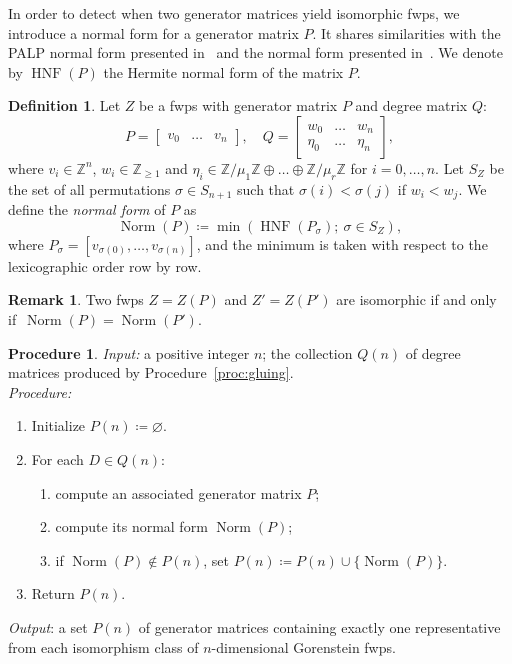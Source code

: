 \documentclass{amsart}
\DeclareMathOperator{\HNF}{HNF}
\DeclareMathOperator{\Norm}{Norm}
\newcommand{\Z}{\mathbb{Z}}
\theoremstyle{definition}
\newtheorem{definition}[lem]{Definition}
\newtheorem{remark}[lem]{Remark}
\newtheorem{procedure}[lem]{Procedure}
\begin{document}
In order to detect when two generator matrices yield isomorphic fwps, we introduce a normal form for a generator matrix $P$. It shares similarities with the PALP normal form presented in~\cite{KS} and the normal form presented in~\cite{Bauerle2}. We denote by $\HNF(P)$ the Hermite normal form of the matrix $P$.

\begin{definition}
    Let $Z$ be a fwps with generator matrix $P$ and degree matrix $Q$:
    $$
    P=\begin{bmatrix}
        v_0 & \dots & v_n
    \end{bmatrix},\quad Q=\begin{bmatrix}
        w_0 & \dots & w_n\\
        \eta_0 & \dots & \eta_n
    \end{bmatrix},
    $$
    where $v_i\in\Z^{n}$, $w_i\in\Z_{\geq 1}$ and $\eta_{i}\in\Z/\mu_1\Z\oplus\dots\oplus\Z/\mu_r\Z$ for $i=0,\dots,n$. Let $S_Z$ be the set of all permutations $\sigma\in S_{n+1}$ such that $\sigma(i)<\sigma(j)$ if $w_i<w_j$. We define the \emph{normal form} of $P$ as 
    $$
    \Norm(P)\coloneqq\min(\HNF(P_\sigma);\ \sigma\in S_Z),
    $$
    where $P_\sigma=[v_{\sigma(0)},\dots,v_{\sigma(n)}]$, and the minimum is taken with respect to the lexicographic order row by row.
\end{definition}

\begin{remark}\label{rmk:Norm}
    Two fwps $Z=Z(P)$ and $Z'=Z(P')$ are isomorphic if and only if~$\Norm(P)=\Norm(P')$.
\end{remark}

\begin{procedure}\label{proc:filter}
\emph{Input:} a positive integer $n$; the collection $Q(n)$ of degree matrices produced by Procedure~\ref{proc:gluing}.\\ \emph{Procedure:}
\begin{enumerate}
  \item Initialize $P(n)\coloneqq\varnothing$.
  \item For each $D\in Q(n)$:
    \begin{enumerate}
      \item compute an associated generator matrix $P$;
      \item compute its normal form $\Norm(P)$;
      \item if $\Norm(P)\notin P(n)$, set $P(n)\coloneqq P(n)\cup\{\Norm(P)\}$.
    \end{enumerate}
  \item Return $P(n)$.
\end{enumerate}
\emph{Output}: a set $P(n)$ of generator matrices containing exactly one representative from each isomorphism class of $n$-dimensional Gorenstein fwps.
\end{procedure}
\end{document}
